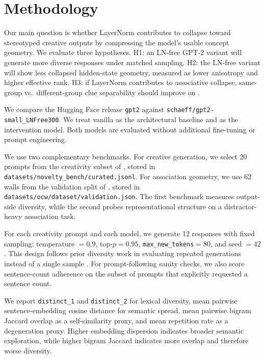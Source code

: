 \section{Methodology}
\label{sec:methodology}

 Our main question is whether LayerNorm contributes to collapse toward stereotyped creative outputs by compressing the model's usable concept geometry. We evaluate three hypotheses. H1: an LN-free GPT-2 variant will generate more diverse responses under matched sampling. H2: the LN-free variant will show less collapsed hidden-state geometry, measured as lower anisotropy and higher effective rank. H3: if LayerNorm contributes to associative collapse, same-group vs.\ different-group clue separability should improve on \ocw.

 We compare the Hugging Face release \texttt{gpt2} against \texttt{schaeff/gpt2-small\_LNFree300}. We treat vanilla \gpttwo as the architectural baseline and \lnfreegpt as the intervention model. Both models are evaluated without additional fine-tuning or prompt engineering.

 We use two complementary benchmarks. For creative generation, we select 20 prompts from the creativity subset of \noveltybench, stored in \texttt{datasets/novelty\_bench/curated.jsonl}. For association geometry, we use 62 walls from the validation split of \ocw, stored in \texttt{datasets/ocw/dataset/validation.json}. The first benchmark measures output-side diversity, while the second probes representational structure on a distractor-heavy association task.

 For each creativity prompt and each model, we generate 12 responses with fixed sampling: temperature $=0.9$, top-$p=0.95$, \texttt{max\_new\_tokens}$=80$, and seed $=42$. This design follows prior diversity work in evaluating repeated generations instead of a single sample \citep{zhang2025noveltybench,haase2025creativity}. For prompt-following sanity checks, we also score sentence-count adherence on the subset of prompts that explicitly requested a sentence count.

 We report \texttt{distinct\_1} and \texttt{distinct\_2} for lexical diversity, mean pairwise sentence-embedding cosine distance for semantic spread, mean pairwise bigram Jaccard overlap as a self-similarity proxy, and mean repetition rate as a degeneration proxy. Higher embedding dispersion indicates broader semantic exploration, while higher bigram Jaccard indicates more overlap and therefore worse diversity.

